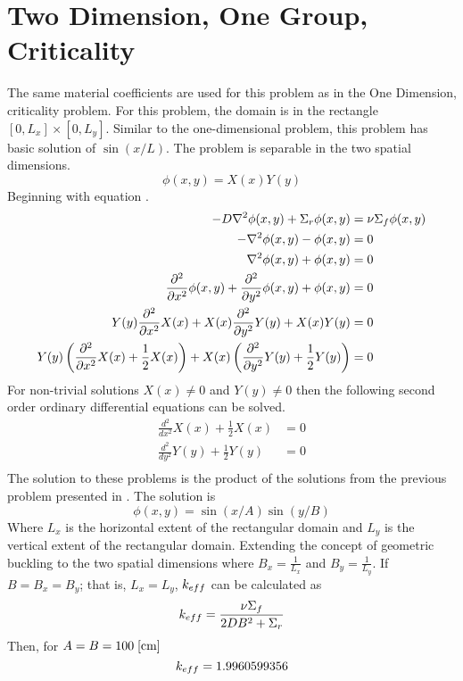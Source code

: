 \section{Two Dimension, One Group, Criticality}
  \label{sec:2d1g}
  The same material coefficients are used for this problem as in the 
  One Dimension, criticality problem. For this problem, the domain is in the 
  rectangle $[0,L_x]\times[0,L_y]$. Similar to the one-dimensional problem, 
  this problem has basic solution of $\sin(x/L)$. The problem is separable in 
  the two spatial dimensions. 
  \begin{equation}
    \phi(x,y) = X(x) Y(y) 
  \end{equation}
  Beginning with equation .
  \begin{align}
    -D \mathbf{\nabla}^2 \phi(x,y) + \Sigma_r \phi(x,y) &= \nu \Sigma_f \phi(x,y) \\
    - \mathbf{\nabla}^2 \phi(x,y) - \phi(x,y) &= 0 \\
    \mathbf{\nabla}^2 \phi(x,y) + \phi(x,y) &= 0 \\
    \frac{\partial^2}{\partial x^2} \phi(x,y) + 
      \frac{\partial^2}{\partial y^2} \phi(x,y) +
      \phi(x,y) &= 0\\
    Y(y)\frac{\partial^2}{\partial x^2}X(x) +
      X(x) \frac{\partial^2}{\partial y^2} Y(y) + X(x)Y(y) &= 0\\
    Y(y)\left(\frac{\partial^2}{\partial x^2}X(x) + \frac{1}{2} X(x)\right)+
      X(x)\left(\frac{\partial^2}{\partial y^2}Y(y) + \frac{1}{2}Y(y)
      \right) &= 0
  \end{align}
  For non-trivial solutions $X(x) \ne 0$ and $Y(y) \ne 0$ then the following
  second order ordinary differential equations can be solved.
  \begin{align}
    \frac{d^2}{dx^2} X(x) + \frac{1}{2} X(x) &= 0 \\
    \frac{d^2}{dy^2} Y(y) + \frac{1}{2} Y(y) &= 0 \\
  \end{align}
  The solution to these problems is the product of the solutions from the 
  previous problem presented in . The solution is
  \begin{equation} \label{eq:twodimensionsol}
    \phi(x,y) = \sin(x/A) \sin(y/B)
  \end{equation}
  Where $L_x$ is the horizontal extent of the rectangular domain and $L_y$ is 
  the vertical extent of the rectangular domain. Extending the concept of 
  geometric buckling to the two spatial dimensions where $B_x = \frac{1}{L_x}$
  and $B_y = \frac{1}{L_y}$. If $B=B_x=B_y$; that is, $L_x=L_y$, $k_{eff}$ can 
  be calculated as
  \begin{equation}
    k_{eff} = \frac{\nu \Sigma_f}{2DB^2 + \Sigma_r} 
  \end{equation}
  Then, for $A=B = 100 \;\text{[{cm}]}$
  \begin{equation}
    k_{eff} = 1.9960599356
  \end{equation}
  
